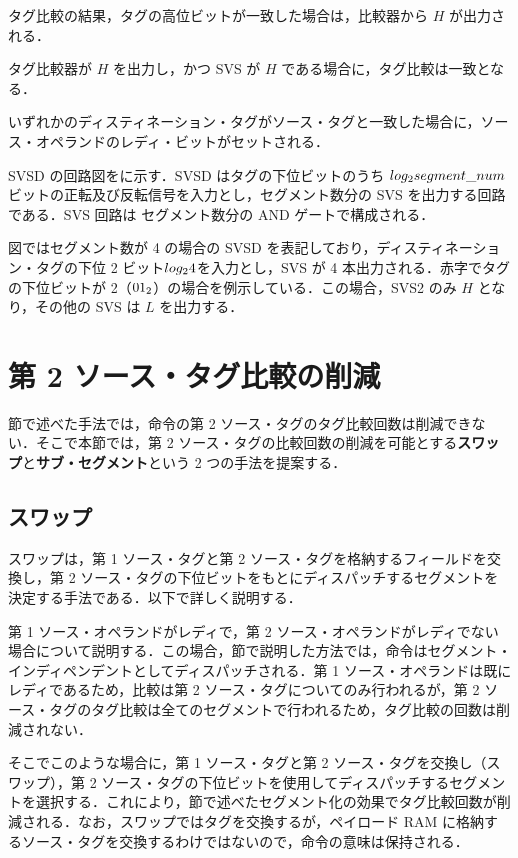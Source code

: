 タグ比較の結果，タグの高位ビットが一致した場合は，比較器から $H$ が出力される．

タグ比較器が $H$ を出力し，かつ SVS が $H$ である場合に，タグ比較は一致となる．

いずれかのディスティネーション・タグがソース・タグと一致した場合に，ソース・オペランドのレディ・ビットがセットされる．

SVSD の回路図をに示す．SVSD はタグの下位ビットのうち $log_2\\ segment\_num $ ビットの正転及び反転信号を入力とし，セグメント数分の SVS を出力する回路である．SVS 回路は セグメント数分の AND ゲートで構成される．

図ではセグメント数が 4 の場合の SVSD を表記しており，ディスティネーション・タグの下位 2 ビット$log_2\\4$を入力とし，SVS が 4 本出力される．赤字でタグの下位ビットが 2（${\rm 01_2}$）の場合を例示している．この場合，SVS2 のみ $H$ となり，その他の SVS は $L$ を出力する． 

\section{第 2 ソース・タグ比較の削減}
\label{sec:second_tag_comp}
節で述べた手法では，命令の第 2 ソース・タグのタグ比較回数は削減できない．そこで本節では，第 2 ソース・タグの比較回数の削減を可能とする\textbf{スワップ}と\textbf{サブ・セグメント}という 2 つの手法を提案する．

\subsection{スワップ}
\label{sec:swap}
スワップは，第 1 ソース・タグと第 2 ソース・タグを格納するフィールドを交換し，第 2 ソース・タグの下位ビットをもとにディスパッチするセグメントを決定する手法である．以下で詳しく説明する．

第 1 ソース・オペランドがレディで，第 2 ソース・オペランドがレディでない場合について説明する．この場合，節で説明した方法では，命令はセグメント・インディペンデントとしてディスパッチされる．第 1 ソース・オペランドは既にレディであるため，比較は第 2 ソース・タグについてのみ行われるが，第 2  ソース・タグのタグ比較は全てのセグメントで行われるため，タグ比較の回数は削減されない．

そこでこのような場合に，第 1 ソース・タグと第 2 ソース・タグを交換し（スワップ），第 2 ソース・タグの下位ビットを使用してディスパッチするセグメントを選択する．これにより，節で述べたセグメント化の効果でタグ比較回数が削減される．なお，スワップではタグを交換するが，ペイロード RAM に格納するソース・タグを交換するわけではないので，命令の意味は保持される．

